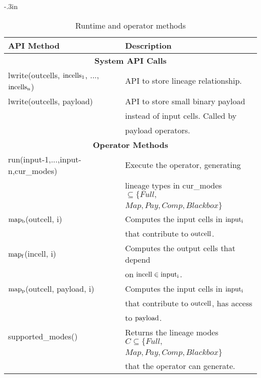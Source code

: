 \begin{table}[t!]
\vspace{-.2in}
\advance\leftskip-.3in
\footnotesize
\caption{Runtime and operator methods}
  \begin{tabular}{ | l | l  | }
    \hline
    {\bf API Method} & {\bf Description} \\ \hline \hline
    \multicolumn{2}{|c|}{\bf System API Calls} \\ \hline
    lwrite(outcells, ${\rm incells_1}$, ...,$ {\rm incells_n}$) & API
    to store lineage relationship.   \\ \hline
    lwrite(outcells, payload) & API to store small binary payload\\
                              &instead of input cells.  Called by \\
			      &payload operators.  \\ \hline
    \multicolumn{2}{|c|}{\bf Operator Methods} \\ \hline
    run(input-1,...,input-n,cur\_modes)
                              & Execute the operator, generating \\
			      & lineage types in cur\_modes $\subseteq \{Full,$\\
			      &$Map, Pay, Comp, Blackbox\}$  \\ \hline

    ${\rm map_b}$(outcell, i) & Computes the input cells in ${\rm input_i}$\\
                              &that contribute to ${\rm outcell}$.\\ \hline
    ${\rm map_f}$(incell, i) & Computes the output cells that depend\\
                             &on ${\rm incell} \in {\rm input_i}$. \\ \hline
    ${\rm map_p}$(outcell, payload, i)
                             & Computes the input cells in  ${\rm input_i}$ \\
			     &that contribute to ${\rm outcell}$, has access \\
			     &to ${\rm payload}$. \\ \hline
    supported\_modes()  &  Returns the lineage modes $C \subseteq \{Full,$\\
                        &$Map, Pay, Comp, Blackbox\}$ \\
    &that the operator can generate. \\ \hline


\end{tabular}
\label{t:api}
\end{table}



